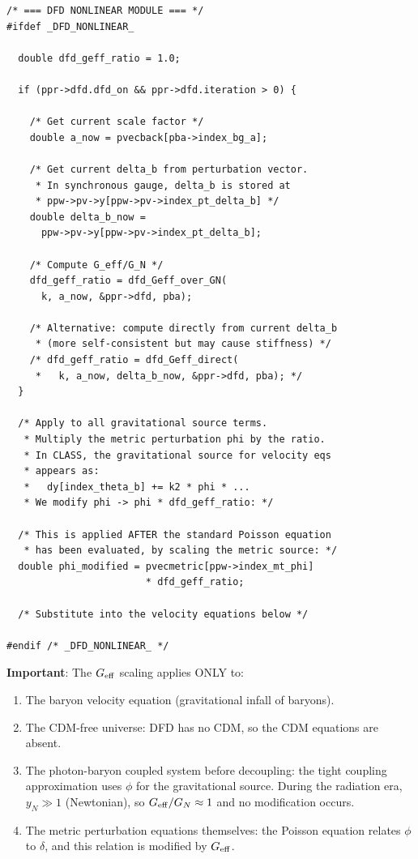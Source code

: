 \documentclass[11pt]{article}
\theoremstyle{definition}
\theoremstyle{remark}
\newcommand{\Geff}{G_{\rm eff}}
\begin{document}
\begin{lstlisting}[numbers=none,caption={Patch to perturbations.c (perturbations\_derivs)}]
/* === DFD NONLINEAR MODULE === */
#ifdef _DFD_NONLINEAR_

  double dfd_geff_ratio = 1.0;

  if (ppr->dfd.dfd_on && ppr->dfd.iteration > 0) {

    /* Get current scale factor */
    double a_now = pvecback[pba->index_bg_a];

    /* Get current delta_b from perturbation vector.
     * In synchronous gauge, delta_b is stored at
     * ppw->pv->y[ppw->pv->index_pt_delta_b] */
    double delta_b_now =
      ppw->pv->y[ppw->pv->index_pt_delta_b];

    /* Compute G_eff/G_N */
    dfd_geff_ratio = dfd_Geff_over_GN(
      k, a_now, &ppr->dfd, pba);

    /* Alternative: compute directly from current delta_b
     * (more self-consistent but may cause stiffness) */
    /* dfd_geff_ratio = dfd_Geff_direct(
     *   k, a_now, delta_b_now, &ppr->dfd, pba); */
  }

  /* Apply to all gravitational source terms.
   * Multiply the metric perturbation phi by the ratio.
   * In CLASS, the gravitational source for velocity eqs
   * appears as:
   *   dy[index_theta_b] += k2 * phi * ...
   * We modify phi -> phi * dfd_geff_ratio: */

  /* This is applied AFTER the standard Poisson equation
   * has been evaluated, by scaling the metric source: */
  double phi_modified = pvecmetric[ppw->index_mt_phi]
                        * dfd_geff_ratio;

  /* Substitute into the velocity equations below */

#endif /* _DFD_NONLINEAR_ */
\end{lstlisting}

\textbf{Important}: The $\Geff$ scaling applies ONLY to:
\begin{enumerate}
\item The baryon velocity equation (gravitational infall of baryons).
\item The CDM-free universe: DFD has no CDM, so the CDM equations
  are absent.
\item The photon-baryon coupled system before decoupling: the tight
  coupling approximation uses $\phi$ for the gravitational source.
  During the radiation era, $y_N \gg 1$ (Newtonian), so $\Geff/G_N
  \approx 1$ and no modification occurs.
\item The metric perturbation equations themselves: the Poisson
  equation relates $\phi$ to $\delta$, and this relation is modified
  by $\Geff$.
\end{enumerate}
\end{document}
